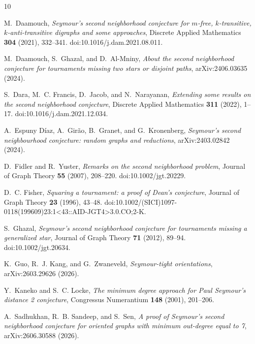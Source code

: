 \documentclass[12pt]{article}
\theoremstyle{plainsl}
\theoremstyle{remark}
\begin{document}
\begin{thebibliography}{10}

M.~Daamouch,
\emph{Seymour's second neighborhood conjecture for $m$-free, $k$-transitive,
$k$-anti-transitive digraphs and some approaches},
Discrete Applied Mathematics \textbf{304} (2021), 332--341.
doi:10.1016/j.dam.2021.08.011.

M.~Daamouch, S.~Ghazal, and D.~Al-Mniny,
\emph{About the second neighborhood conjecture for tournaments missing two
stars or disjoint paths},
arXiv:2406.03635 (2024).

S.~Dara, M.~C. Francis, D.~Jacob, and N.~Narayanan,
\emph{Extending some results on the second neighborhood conjecture},
Discrete Applied Mathematics \textbf{311} (2022), 1--17.
doi:10.1016/j.dam.2021.12.034.

A.~Espuny D\'iaz, A.~Gir\~ao, B.~Granet, and G.~Kronenberg,
\emph{Seymour's second neighbourhood conjecture: random graphs and reductions},
arXiv:2403.02842 (2024).

D.~Fidler and R.~Yuster,
\emph{Remarks on the second neighborhood problem},
Journal of Graph Theory \textbf{55} (2007), 208--220.
doi:10.1002/jgt.20229.

D.~C. Fisher,
\emph{Squaring a tournament: a proof of Dean's conjecture},
Journal of Graph Theory \textbf{23} (1996), 43--48.
doi:10.1002/(SICI)1097-0118(199609)23:1<43::AID-JGT4>3.0.CO;2-K.

S.~Ghazal,
\emph{Seymour's second neighborhood conjecture for tournaments missing a
generalized star},
Journal of Graph Theory \textbf{71} (2012), 89--94.
doi:10.1002/jgt.20634.

K.~Guo, R.~J. Kang, and G.~Zwaneveld,
\emph{Seymour-tight orientations},
arXiv:2603.29626 (2026).

Y.~Kaneko and S.~C. Locke,
\emph{The minimum degree approach for Paul Seymour's distance 2 conjecture},
Congressus Numerantium \textbf{148} (2001), 201--206.

A.~Sadhukhan, R.~B. Sandeep, and S.~Sen,
\emph{A proof of Seymour's second neighborhood conjecture for oriented graphs
with minimum out-degree equal to 7},
arXiv:2606.30588 (2026).

\end{thebibliography}
\end{document}
